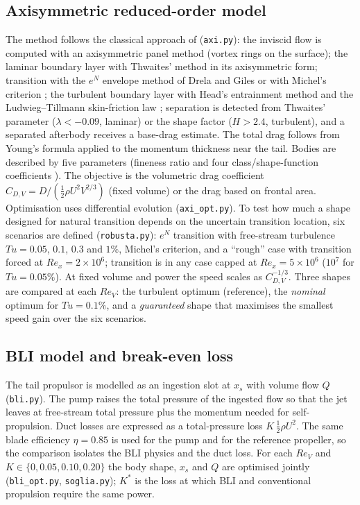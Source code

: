 \documentclass[11pt,a4paper]{article}
\newcommand{\ReV}{\mathit{Re}_V}
\begin{document}
\subsection{Axisymmetric reduced-order model}
The method follows the classical approach of \cite{young1939,myring1976,lutz1998}
(\texttt{axi.py}): the inviscid flow is computed with an axisymmetric panel method (vortex
rings on the surface); the laminar boundary layer with Thwaites' method \cite{thwaites1949}
in its axisymmetric form; transition with the $e^N$ envelope method of Drela and Giles
\cite{drela1987} or with Michel's criterion \cite{michel1951}; the turbulent boundary layer with
Head's entrainment method \cite{head1958} and the Ludwieg--Tillmann skin-friction law
\cite{ludwieg1950}; separation is detected from Thwaites' parameter ($\lambda<-0.09$, laminar) or the shape factor
($H>2.4$, turbulent), and a separated afterbody receives a base-drag estimate. The total drag follows from
Young's formula \cite{young1939} applied to the momentum thickness near the tail.
Bodies are described by five parameters (fineness ratio and four class/shape-function
coefficients \cite{kulfan2008}). The objective is the volumetric drag coefficient
$C_{D,V}=D/(\tfrac12\rho U^2V^{2/3})$ (fixed volume) or the drag based on frontal area.
Optimisation uses differential evolution \cite{storn1997} (\texttt{axi\_opt.py}).
To test how much a shape designed for natural transition depends on the uncertain transition
location, six scenarios are defined (\texttt{robusta.py}): $e^N$ transition with free-stream
turbulence $Tu=0.05$, $0.1$, $0.3$ and $1\%$, Michel's criterion, and a ``rough'' case with
transition forced at $Re_x=2\times10^6$; transition is in any case capped at $Re_x=5\times10^6$
($10^7$ for $Tu=0.05\%$). At fixed volume and power the speed scales as $C_{D,V}^{-1/3}$.
Three shapes are compared at each $\ReV$: the turbulent optimum (reference), the
\emph{nominal} optimum for $Tu=0.1\%$, and a \emph{guaranteed} shape that maximises the
smallest speed gain over the six scenarios.

\subsection{BLI model and break-even loss}
The tail propulsor is modelled as an ingestion slot at $x_s$ with volume flow $Q$
(\texttt{bli.py}). The pump raises the total pressure of the ingested flow so that the
jet leaves at free-stream total pressure plus the momentum needed for self-propulsion.
Duct losses are expressed as a total-pressure loss $K\,\tfrac12\rho U^2$. The same blade
efficiency $\eta=0.85$ is used for the pump and for the reference propeller, so the
comparison isolates the BLI physics and the duct loss. For each $\ReV$ and $K\in\{0,0.05,
0.10,0.20\}$ the body shape, $x_s$ and $Q$ are optimised jointly (\texttt{bli\_opt.py},
\texttt{soglia.py}); $K^*$ is the loss at which BLI and conventional propulsion require the
same power.
\end{document}

